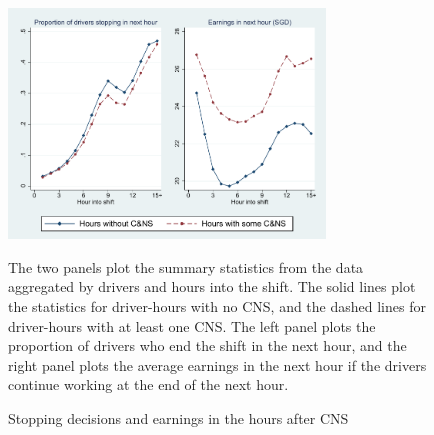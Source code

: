 \documentclass[reviewmode,AEJ]{AEA}
\begin{document}
\begin{figure}[htb]
	{\centering
		\caption{Stopping decisions and earnings in the hours after CNS} %
		\includegraphics[width=0.75\textwidth]{./fg/modelfreecumhours.pdf}
		\label{fg:quitbyhour}
	}
	\begin{figurenotes}
	\small The two panels plot the summary statistics from the data aggregated by drivers and hours into the shift. The solid lines plot the statistics for driver-hours with no CNS, and the dashed lines for driver-hours with at least one CNS. The left panel plots the proportion of drivers who end the shift in the next hour, and the right panel plots the average earnings in the next hour if the drivers continue working at the end of the next hour.
	\end{figurenotes}


\hfill


\end{figure}
\end{document}
